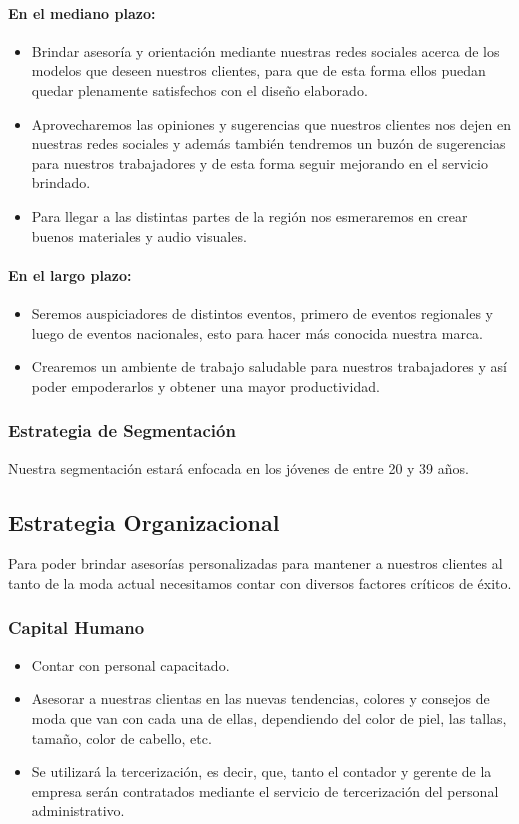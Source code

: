 \documentclass[a4paper,openright,12pt]{book}
\begin{document}
\paragraph{En el mediano plazo:}
\begin{itemize}
\item Brindar asesoría y orientación mediante nuestras redes sociales acerca de los modelos que deseen nuestros clientes, para que de esta forma ellos puedan quedar plenamente satisfechos con el diseño elaborado.
\item Aprovecharemos las opiniones y sugerencias que nuestros clientes nos dejen en nuestras redes sociales y además también tendremos un buzón de sugerencias para nuestros trabajadores y de esta forma seguir mejorando en el servicio brindado.
\item Para llegar a las distintas partes de la región nos esmeraremos en crear buenos materiales y audio visuales.
\end{itemize}

\paragraph{En el largo plazo:}
\begin{itemize}
\item Seremos auspiciadores de distintos eventos, primero de eventos regionales y luego de eventos nacionales, esto para hacer más conocida nuestra marca.
\item Crearemos un ambiente de trabajo saludable para nuestros trabajadores y así poder empoderarlos y obtener una mayor productividad.
\end{itemize}

\subsubsection{Estrategia de Segmentación}
Nuestra segmentación estará enfocada en los jóvenes de entre 20 y 39 años.

\subsection{Estrategia Organizacional}
Para poder brindar asesorías personalizadas para mantener a nuestros clientes al tanto de la moda actual necesitamos contar con diversos factores críticos de éxito.

\subsubsection{Capital Humano}
\begin{itemize}
\item Contar con personal capacitado.
\item Asesorar a nuestras clientas en las nuevas tendencias, colores y consejos de moda que van con cada una de ellas, dependiendo del color de piel, las tallas, tamaño, color de cabello, etc.
\item Se utilizará la tercerización, es decir, que, tanto el contador y gerente de la empresa serán contratados mediante el servicio de tercerización del personal administrativo.
\end{itemize}
\end{document}
